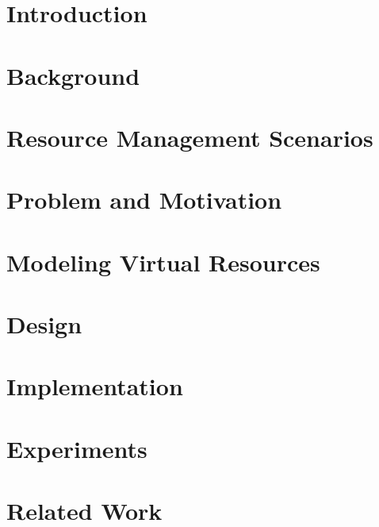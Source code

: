 \documentclass[singlespace]{ccw_chithesis}
\begin{document}
\tableofcontents
\listoffigures
\listoftables

\renewcommand{\chaptername}{Section}

\mainmatter

\chapter{Introduction}
\label{cha:introduction}



\chapter{Background}
\label{cha:background}



\chapter{Resource Management Scenarios}
\label{cha:scenarios}



\chapter{Problem and Motivation}
\label{cha:problem}



\chapter{Modeling Virtual Resources}
\label{cha:virtualresources}



\chapter{Design}
\label{cha:design}


\chapter{Implementation}
\label{cha:impl}



\chapter{Experiments}
\label{cha:experiments}



\chapter{Related Work}
\label{cha:related}

\end{document}
